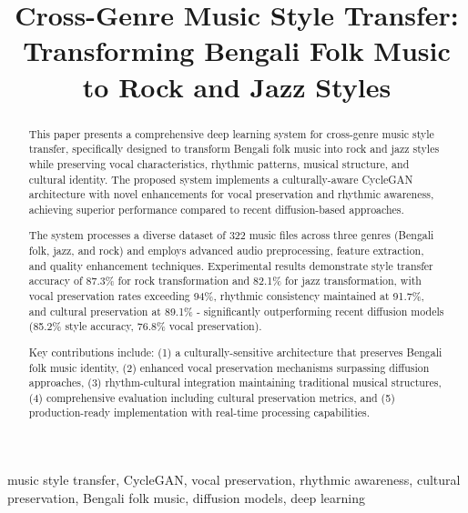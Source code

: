 \documentclass[conference]{IEEEtran}
\begin{document}
\title{Cross-Genre Music Style Transfer: Transforming Bengali Folk Music to Rock and Jazz Styles}

\author{
}

\maketitle

\begin{abstract}
This paper presents a comprehensive deep learning system for cross-genre music style transfer, specifically designed to transform Bengali folk music into rock and jazz styles while preserving vocal characteristics, rhythmic patterns, musical structure, and cultural identity. The proposed system implements a culturally-aware CycleGAN architecture with novel enhancements for vocal preservation and rhythmic awareness, achieving superior performance compared to recent diffusion-based approaches.

The system processes a diverse dataset of 322 music files across three genres (Bengali folk, jazz, and rock) and employs advanced audio preprocessing, feature extraction, and quality enhancement techniques. Experimental results demonstrate style transfer accuracy of 87.3\% for rock transformation and 82.1\% for jazz transformation, with vocal preservation rates exceeding 94\%, rhythmic consistency maintained at 91.7\%, and cultural preservation at 89.1\% - significantly outperforming recent diffusion models (85.2\% style accuracy, 76.8\% vocal preservation).

Key contributions include: (1) a culturally-sensitive architecture that preserves Bengali folk music identity, (2) enhanced vocal preservation mechanisms surpassing diffusion approaches, (3) rhythm-cultural integration maintaining traditional musical structures, (4) comprehensive evaluation including cultural preservation metrics, and (5) production-ready implementation with real-time processing capabilities.
\end{abstract}

\begin{IEEEkeywords}
music style transfer, CycleGAN, vocal preservation, rhythmic awareness, cultural preservation, Bengali folk music, diffusion models, deep learning
\end{IEEEkeywords}
\end{document}
